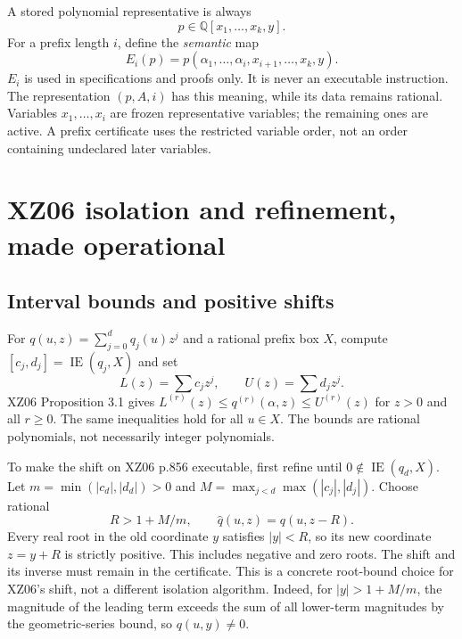 \documentclass[11pt]{article}
\theoremstyle{definition}
\newcommand{\QQ}{\mathbb Q}
\newcommand{\Eval}{\operatorname{IE}}
\begin{document}
A stored polynomial representative is always
\[p\in\QQ[x_1,\ldots,x_k,y].\]
For a prefix length $i$, define the \emph{semantic} map
\[E_i(p)=p(\alpha_1,\ldots,\alpha_i,x_{i+1},\ldots,x_k,y).
\]
$E_i$ is used in specifications and proofs only. It is never an executable
instruction. The representation $(p,A,i)$ has this meaning, while its data remains
rational. Variables $x_1,\ldots,x_i$ are frozen representative variables; the
remaining ones are active. A prefix certificate uses the restricted variable order,
not an order containing undeclared later variables.

\section{XZ06 isolation and refinement, made operational}
\subsection{Interval bounds and positive shifts}
For $q(u,z)=\sum_{j=0}^d q_j(u)z^j$ and a rational prefix box $X$, compute
$[c_j,d_j]=\Eval(q_j,X)$ and set
\[L(z)=\sum c_jz^j,\qquad U(z)=\sum d_jz^j.\]
XZ06 Proposition 3.1 gives $L^{(r)}(z)\le q^{(r)}(\alpha,z)\le U^{(r)}(z)$
for $z>0$ and all $r\ge0$. The same inequalities hold for all $u\in X$.
The bounds are rational polynomials, not necessarily integer polynomials.

To make the shift on XZ06 p.856 executable, first refine until
$0\notin\Eval(q_d,X)$. Let $m=\min(|c_d|,|d_d|)>0$ and
$M=\max_{j<d}\max(|c_j|,|d_j|)$. Choose rational
\[R>1+M/m,\qquad \widehat q(u,z)=q(u,z-R).
\]
Every real root in the old coordinate $y$ satisfies $|y|<R$, so its new
coordinate $z=y+R$ is strictly positive. This includes negative and zero roots.
The shift and its inverse must remain in the certificate. This is a concrete
root-bound choice for XZ06's shift, not a different isolation algorithm.
Indeed, for $|y|>1+M/m$, the magnitude of the leading term exceeds the sum of
all lower-term magnitudes by the geometric-series bound, so $q(u,y)\ne0$.
\end{document}
